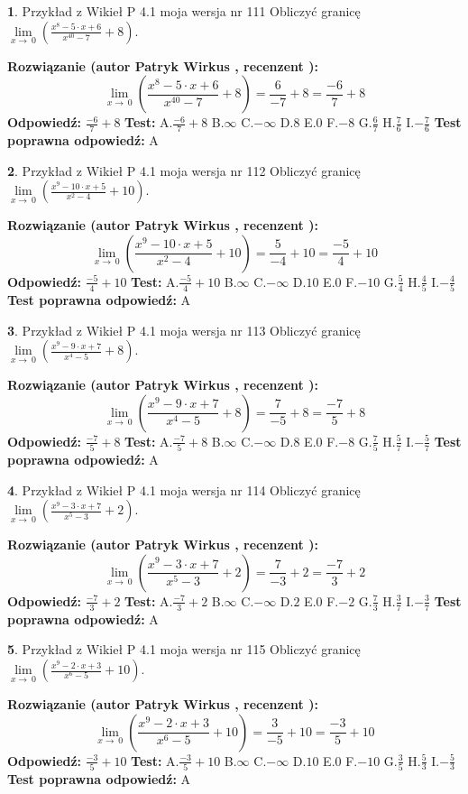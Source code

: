 \documentclass[12pt, a4paper]{article}
\theoremstyle{definition} %
\newtheorem{zad}{}
\newcommand{\zadStart}[1]{\begin{zad}#1\newline}
\newcommand{\zadStop}{\end{zad}}
\newcommand{\rozwStart}[2]{\noindent \textbf{Rozwiązanie (autor #1 , recenzent #2): }\newline}
\newcommand{\rozwStop}{\newline}
\newcommand{\odpStart}{\noindent \textbf{Odpowiedź:}\newline}
\newcommand{\odpStop}{\newline}
\newcommand{\testStart}{\noindent \textbf{Test:}\newline}
\newcommand{\testStop}{\newline}
\newcommand{\kluczStart}{\noindent \textbf{Test poprawna odpowiedź:}\newline}
\newcommand{\kluczStop}{\newline}
\begin{document}
\zadStart{Przykład z Wikieł P 4.1 moja wersja nr 111}
Obliczyć granicę $\lim\limits_{x\to\ 0}(\frac{x^{8}-5 \cdot x +6}{x^{40}-7}+8)$.
\zadStop
\rozwStart{Patryk Wirkus}{}
$$\lim\limits_{x\to\ 0}(\frac{x^{8}-5 \cdot x +6}{x^{40}-7}+8)=\frac{6}{-7}+8=\frac{-6}{7}+8$$
\rozwStop
\odpStart
$\frac{-6}{7}+8$
\odpStop
\testStart
A.$\frac{-6}{7}+8$
B.$\infty$
C.$-\infty$
D.$8$
E.$0$
F.$-8$
G.$\frac{6}{7}$
H.$\frac{7}{6}$
I.$-\frac{7}{6}$
\testStop
\kluczStart
A
\kluczStop



\zadStart{Przykład z Wikieł P 4.1 moja wersja nr 112}
Obliczyć granicę $\lim\limits_{x\to\ 0}(\frac{x^{9}-10 \cdot x +5}{x^{2}-4}+10)$.
\zadStop
\rozwStart{Patryk Wirkus}{}
$$\lim\limits_{x\to\ 0}(\frac{x^{9}-10 \cdot x +5}{x^{2}-4}+10)=\frac{5}{-4}+10=\frac{-5}{4}+10$$
\rozwStop
\odpStart
$\frac{-5}{4}+10$
\odpStop
\testStart
A.$\frac{-5}{4}+10$
B.$\infty$
C.$-\infty$
D.$10$
E.$0$
F.$-10$
G.$\frac{5}{4}$
H.$\frac{4}{5}$
I.$-\frac{4}{5}$
\testStop
\kluczStart
A
\kluczStop



\zadStart{Przykład z Wikieł P 4.1 moja wersja nr 113}
Obliczyć granicę $\lim\limits_{x\to\ 0}(\frac{x^{9}-9 \cdot x +7}{x^{4}-5}+8)$.
\zadStop
\rozwStart{Patryk Wirkus}{}
$$\lim\limits_{x\to\ 0}(\frac{x^{9}-9 \cdot x +7}{x^{4}-5}+8)=\frac{7}{-5}+8=\frac{-7}{5}+8$$
\rozwStop
\odpStart
$\frac{-7}{5}+8$
\odpStop
\testStart
A.$\frac{-7}{5}+8$
B.$\infty$
C.$-\infty$
D.$8$
E.$0$
F.$-8$
G.$\frac{7}{5}$
H.$\frac{5}{7}$
I.$-\frac{5}{7}$
\testStop
\kluczStart
A
\kluczStop



\zadStart{Przykład z Wikieł P 4.1 moja wersja nr 114}
Obliczyć granicę $\lim\limits_{x\to\ 0}(\frac{x^{9}-3 \cdot x +7}{x^{5}-3}+2)$.
\zadStop
\rozwStart{Patryk Wirkus}{}
$$\lim\limits_{x\to\ 0}(\frac{x^{9}-3 \cdot x +7}{x^{5}-3}+2)=\frac{7}{-3}+2=\frac{-7}{3}+2$$
\rozwStop
\odpStart
$\frac{-7}{3}+2$
\odpStop
\testStart
A.$\frac{-7}{3}+2$
B.$\infty$
C.$-\infty$
D.$2$
E.$0$
F.$-2$
G.$\frac{7}{3}$
H.$\frac{3}{7}$
I.$-\frac{3}{7}$
\testStop
\kluczStart
A
\kluczStop



\zadStart{Przykład z Wikieł P 4.1 moja wersja nr 115}
Obliczyć granicę $\lim\limits_{x\to\ 0}(\frac{x^{9}-2 \cdot x +3}{x^{6}-5}+10)$.
\zadStop
\rozwStart{Patryk Wirkus}{}
$$\lim\limits_{x\to\ 0}(\frac{x^{9}-2 \cdot x +3}{x^{6}-5}+10)=\frac{3}{-5}+10=\frac{-3}{5}+10$$
\rozwStop
\odpStart
$\frac{-3}{5}+10$
\odpStop
\testStart
A.$\frac{-3}{5}+10$
B.$\infty$
C.$-\infty$
D.$10$
E.$0$
F.$-10$
G.$\frac{3}{5}$
H.$\frac{5}{3}$
I.$-\frac{5}{3}$
\testStop
\kluczStart
A
\kluczStop
\end{document}
